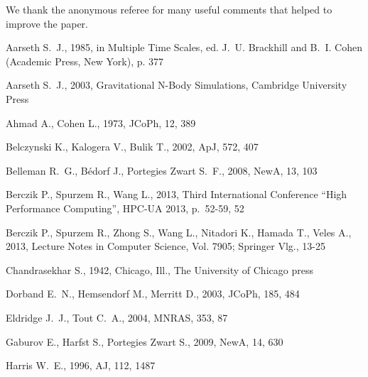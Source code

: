 \documentclass[usenatbib,aas_macros]{mn2e}
\begin{document}
We thank the anonymous referee for many useful comments that helped to improve the paper.

\begin{thebibliography}{999}

Aarseth S.~J., 1985, in Multiple Time Scales, ed. J.~U. Brackhill and B.~I. Cohen (Academic Press, New York), p. 377

Aarseth S.~J., 2003, Gravitational N-Body Simulations, Cambridge University Press

 Ahmad A., Cohen L., 1973, JCoPh, 12, 389 

 Belczynski K., Kalogera V., Bulik T., 2002, ApJ, 572, 407 

 Belleman R.~G., B{\'e}dorf J., Portegies Zwart S.~F., 2008, NewA, 13, 103 

 Berczik P., Spurzem R., Wang L., 2013, Third International Conference ``High Performance Computing'', HPC-UA 2013, p.~52-59, 52 

Berczik P., Spurzem R., Zhong S., Wang L., Nitadori K., Hamada T., Veles A., 2013, Lecture Notes in Computer Science, Vol. 7905; Springer Vlg., 13-25

Chandrasekhar S., 1942, Chicago, Ill., The University of Chicago press

 Dorband E.~N., Hemsendorf M., Merritt D., 2003, JCoPh, 185, 484 

 Eldridge J.~J., Tout C.~A., 2004, MNRAS, 353, 87 

 Gaburov E., Harfst S., Portegies Zwart S., 2009, NewA, 14, 630 

 Harris 
W.~E., 1996, AJ, 112, 1487 


\end{thebibliography}
\end{document}
